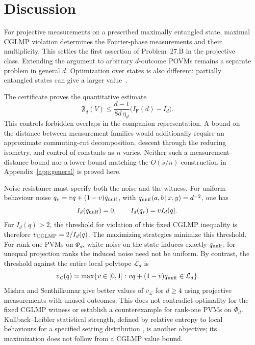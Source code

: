 \documentclass[aps,prl,reprint,superscriptaddress,longbibliography,floatfix,raggedbottom]{revtex4-2}
\newcommand{\IF}{I_{\mathrm F}}
\newcommand{\Fd}{\mathfrak F_d}
\begin{document}
\section{Discussion}

For projective measurements on a prescribed maximally entangled state,
maximal CGLMP violation determines the Fourier-phase measurements and
their multiplicity. This settles the first assertion of Problem~27.B
in the projective class. Extending the argument to arbitrary
$d$-outcome POVMs remains a separate problem in general $d$.
Optimization over states is also different: partially entangled states
can give a larger value~\cite{ADGL}.

The certificate proves the quantitative estimate
\begin{equation}\label{eq:overlapstability}
\Fd(V)\le\frac{d-1}{8d\,\eta_d}\bigl(\IF(d)-I_d\bigr).
\end{equation}
This controls forbidden overlaps in the companion representation.
A bound on the distance between measurement families would additionally
require an approximate commuting-cut decomposition, descent through the
reducing isometry, and control of constants as $n$ varies. Neither such
a measurement-distance bound nor a lower bound matching the $O(s/n)$
construction in Appendix~\ref{app:general} is proved here.

Noise resistance must specify both the noise and the witness. For
uniform behaviour noise $q_v=vq+(1-v)q_{\rm unif}$, with
$q_{\rm unif}(a,b\,|\,x,y)=d^{-2}$, one has
\[
I_d(q_{\rm unif})=0,\qquad I_d(q_v)=vI_d(q).
\]
For $I_d(q)>2$, the threshold for violation of this fixed CGLMP
inequality is therefore $v_{\rm CGLMP}=2/I_d(q)$. The maximizing
strategies minimize this threshold. For rank-one PVMs on $\Phi_d$,
white noise on the state induces exactly $q_{\rm unif}$; for unequal
projection ranks the induced noise need not be uniform.
By contrast, the threshold against the entire local polytope
$\mathcal L_d$ is
\[
v_{\mathcal L}(q)=\max\{v\in[0,1]:vq+(1-v)q_{\rm unif}\in\mathcal L_d\}.
\]
Mishra and Senthilkumar \cite[\texttt{clauses/noise-literal},
Theorem~1]{Mishra26b} give better values of $v_{\mathcal L}$ for
$d\ge4$ using projective measurements with unused outcomes. This does
not contradict optimality for the fixed CGLMP witness or establish a
counterexample for rank-one PVMs on $\Phi_d$. Kullback--Leibler
statistical strength, defined by relative entropy to local behaviours
for a specified setting distribution \cite{VDGG}, is another objective;
its maximization does not follow from a CGLMP value bound.
\end{document}
